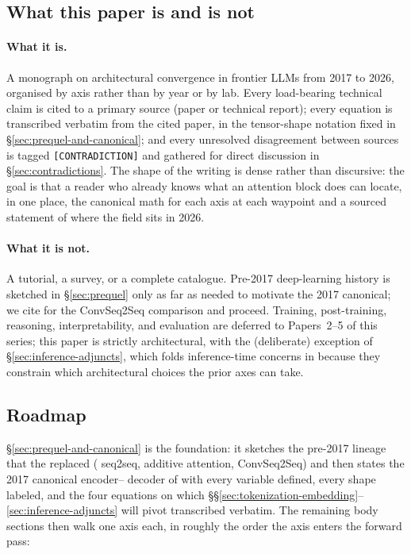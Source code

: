 \subsection*{What this paper is and is not}

\paragraph{What it is.} A monograph on architectural convergence in
frontier LLMs from 2017 to 2026, organised by axis rather than by
year or by lab. Every load-bearing technical claim is cited to a
primary source (paper or technical report); every equation is
transcribed verbatim from the cited paper, in the tensor-shape
notation fixed in \S\ref{sec:prequel-and-canonical}; and every
unresolved disagreement between sources is tagged
\texttt{[CONTRADICTION]} and gathered for direct discussion in
\S\ref{sec:contradictions}. The shape of the writing is dense rather
than discursive: the goal is that a reader who already knows what an
attention block does can locate, in one place, the canonical math for
each axis at each waypoint and a sourced statement of where the field
sits in 2026.

\paragraph{What it is not.} A tutorial, a survey, or a complete
catalogue. Pre-2017 deep-learning history is sketched in
\S\ref{sec:prequel} only as far as needed to motivate the 2017
canonical; we cite \citet{vaswani2017} for the ConvSeq2Seq comparison
and proceed. Training, post-training, reasoning, interpretability, and
evaluation are deferred to Papers~2--5 of this series; this paper is
strictly architectural, with the (deliberate) exception of
\S\ref{sec:inference-adjuncts}, which folds inference-time concerns in
because they constrain which architectural choices the prior axes can
take.

\subsection*{Roadmap}

\S\ref{sec:prequel-and-canonical} is the foundation: it sketches the
pre-2017 lineage that the  replaced ( seq2seq, additive
attention, ConvSeq2Seq) and then states the 2017 canonical encoder--
decoder of \citet{vaswani2017} with every variable defined, every
shape labeled, and the four equations on which
\S\S\ref{sec:tokenization-embedding}--\ref{sec:inference-adjuncts}
will pivot transcribed verbatim. The remaining body sections then
walk one axis each, in roughly the order the axis enters the
forward pass:

